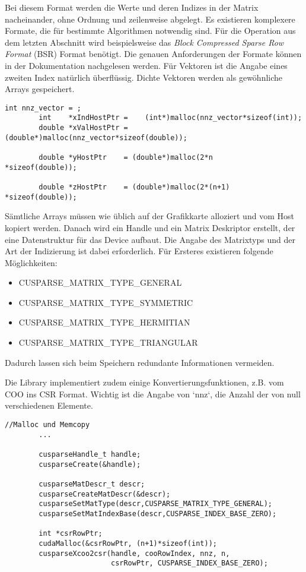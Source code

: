		Bei diesem Format werden die Werte und deren Indizes in der Matrix nacheinander, ohne Ordnung und zeilenweise abgelegt. Es existieren komplexere Formate, die für bestimmte Algorithmen notwendig sind. Für die Operation aus dem letzten Abschnitt wird beispielsweise das \textit{Block Compressed Sparse Row Format} (BSR) Format benötigt. Die genauen Anforderungen der Formate können in der Dokumentation nachgelesen werden. \cite{cusparseDoc}
		Für Vektoren ist die Angabe eines zweiten Index natürlich überflüssig. Dichte Vektoren werden als gewöhnliche Arrays gespeichert.
		\begin{lstlisting}[caption=cuSPARSE: Vector erstellen]
		int nnz_vector = ;
		int    *xIndHostPtr =    (int*)malloc(nnz_vector*sizeof(int));
		double *xValHostPtr = (double*)malloc(nnz_vector*sizeof(double));
    
		double *yHostPtr    = (double*)malloc(2*n       *sizeof(double));
    
		double *zHostPtr    = (double*)malloc(2*(n+1)   *sizeof(double));
		\end{lstlisting}

		Sämtliche Arrays müssen wie üblich auf der Grafikkarte alloziert und vom Host kopiert werden. Danach wird ein \gls{Handle} und ein Matrix Deskriptor erstellt, der eine Datenstruktur für das Device aufbaut. Die Angabe des Matrixtyps und der Art der Indizierung ist dabei erforderlich. Für Ersteres existieren folgende Möglichkeiten:
		\begin{itemize}
			\item CUSPARSE{\_}MATRIX{\_}TYPE{\_}GENERAL
			\item CUSPARSE{\_}MATRIX{\_}TYPE{\_}SYMMETRIC
			\item CUSPARSE{\_}MATRIX{\_}TYPE{\_}HERMITIAN
			\item CUSPARSE{\_}MATRIX{\_}TYPE{\_}TRIANGULAR
		\end{itemize}

		Dadurch lassen sich beim Speichern redundante Informationen vermeiden.

		Die Library implementiert zudem einige Konvertierungsfunktionen, z.B. vom COO ins CSR Format. Wichtig ist die Angabe von \li`nnz`, die Anzahl der von null verschiedenen Elemente.
		\begin{lstlisting}[caption=cuSPARSE: Initialisierung und Konvertierung]
		//Malloc und Memcopy
		...

		cusparseHandle_t handle;
		cusparseCreate(&handle);

		cusparseMatDescr_t descr;
		cusparseCreateMatDescr(&descr);
		cusparseSetMatType(descr,CUSPARSE_MATRIX_TYPE_GENERAL);
		cusparseSetMatIndexBase(descr,CUSPARSE_INDEX_BASE_ZERO);
    
		int *csrRowPtr; 
		cudaMalloc(&csrRowPtr, (n+1)*sizeof(int));
		cusparseXcoo2csr(handle, cooRowIndex, nnz, n, 
		                 csrRowPtr, CUSPARSE_INDEX_BASE_ZERO);
		\end{lstlisting}

